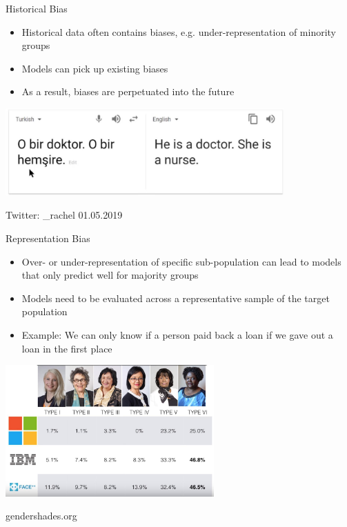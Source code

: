 \documentclass[11pt,compress,t,notes=noshow, xcolor=table]{beamer}
\begin{document}
\begin{vbframe}{Historical Bias}
  \begin{itemize}
  \item Historical data often contains biases, e.g. under-representation of minority groups
  \item Models can pick up existing biases
  \item As a result, biases are perpetuated into the future
  \end{itemize}
  \vspace{1cm}
\begin{center}
\includegraphics[width=0.8\textwidth]{figures/historical_bias.png}

\tiny{Twitter: \@math\_rachel 01.05.2019}
\end{center}
\end{vbframe}

\begin{vbframe}{Representation Bias}
 \vspace{-0.25cm}
  \begin{itemize}
  \item Over- or under-representation of specific sub-population can lead to models that only predict well for majority groups
  \item Models need to be evaluated across a representative sample of the target population
  \item Example: We can only know if a person paid back a loan if we gave out a loan in the first place
  \end{itemize}
\begin{center}
\includegraphics[width=0.6\textwidth]{figures/gendershades.jpeg}

\tiny{gendershades.org}
\end{center}
\end{vbframe}
\end{document}
